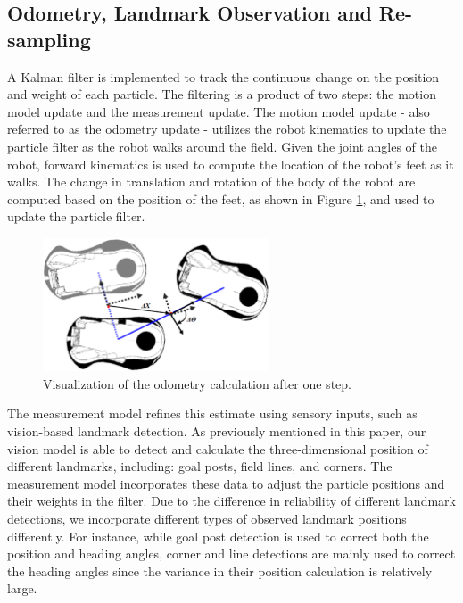 \documentclass{article}
\begin{document}
  \subsection{Odometry, Landmark Observation and Re-sampling}
	  A Kalman filter is implemented to track the continuous change on the position and weight of each particle. The filtering is a product of two steps: the motion model update and the measurement update. The motion model update - also referred to as the odometry update - utilizes the robot kinematics to update the particle filter as the robot walks around the field. Given the joint angles of the robot, forward kinematics is used to compute the location of the robot's feet as it walks. The change in translation and rotation of the body of the robot are computed based on the position of the feet, as shown in Figure \ref{fig:odometry}, and used to update the particle filter.
    \begin{figure}[H]
      \centering
      \includegraphics[width=0.6\textwidth]{figures/Odometry.eps}
      \caption{Visualization of the odometry calculation after one step.}
      \label{fig:odometry}
    \end{figure}

    The measurement model refines this estimate using sensory inputs, such as vision-based landmark detection. As previously mentioned in this paper, our vision model is able to detect and calculate the three-dimensional position of different landmarks, including: goal posts, field lines, and corners. The measurement model incorporates these data to adjust the particle positions and their weights in the filter. Due to the difference in reliability of different landmark detections, we incorporate different types of observed landmark positions differently. For instance, while goal post detection is used to correct both the position and heading angles, corner and line detections are mainly used to correct the heading angles since the variance in their position calculation is relatively large.
\end{document}
